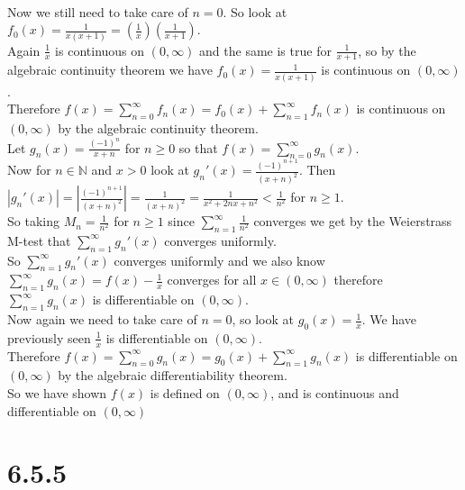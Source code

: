 \documentclass{article}
\begin{document}
\begin{center}
    \\Now we still need to take care of $n = 0$. So look at $f_0 (x) =\frac{1}{x(x+1)} = (\frac{1}{x})(\frac{1}{x+1})$.
    \\Again $\frac{1}{x}$ is continuous on $(0,\infty )$ and the same is true for $\frac{1}{x+1}$, so by the algebraic continuity theorem we have $f_0 (x) =\frac{1}{x(x+1)}$ is continuous on $(0,\infty )$.
    \\Therefore $f(x) =\sum _{n=0}^{\infty} f_n (x) = f_0 (x) +\sum _{n=1}^{\infty} f_n (x)$ is continuous on $(0,\infty )$ by the algebraic continuity theorem.
    \\Let $g_n (x) =\frac{(-1)^n}{x + n}$ for $n\geq 0$ so that $f(x) =\sum _{n=0}^{\infty} g_n (x)$.
    \\Now for $n\in\mathbb{N}$ and $x > 0$ look at $g_n '(x) =\frac{(-1)^{n+1}}{(x+n)^2}$. Then $|g_n '(x)| =|\frac{(-1)^{n+1}}{(x+n)^2}| =\frac{1}{(x+n)^2} =\frac{1}{x^2 + 2nx + n^2} <\frac{1}{n^2}$ for $n\geq 1$.
    \\So taking $M_n =\frac{1}{n^2}$ for $n\geq 1$ since $\sum _{n=1}^{\infty}\frac{1}{n^2}$ converges we get by the Weierstrass M-test that $\sum _{n=1}^{\infty} g_n '(x)$ converges uniformly.
    \\So $\sum _{n=1}^{\infty} g_n '(x)$ converges uniformly and we also know $\sum _{n=1}^{\infty} g_n (x) = f(x) -\frac{1}{x}$ converges for all $x\in (0,\infty )$ therefore $\sum _{n=1}^{\infty} g_n (x)$ is differentiable on $(0,\infty )$.
    \\Now again we need to take care of $n = 0$, so look at $g_0 (x) =\frac{1}{x}$. We have previously seen $\frac{1}{x}$ is differentiable on $(0,\infty )$.
    \\Therefore $f(x) =\sum _{n=0}^{\infty} g_n (x) = g_0 (x) +\sum _{n=1}^{\infty} g_n (x)$ is differentiable on $(0,\infty )$ by the algebraic differentiability theorem.
    \\So we have shown $f(x)$ is defined on $(0,\infty )$, and is continuous and differentiable on $(0,\infty )$ \qedsymbol
\end{center}


\newpage
\section*{6.5.5}
\end{document}
